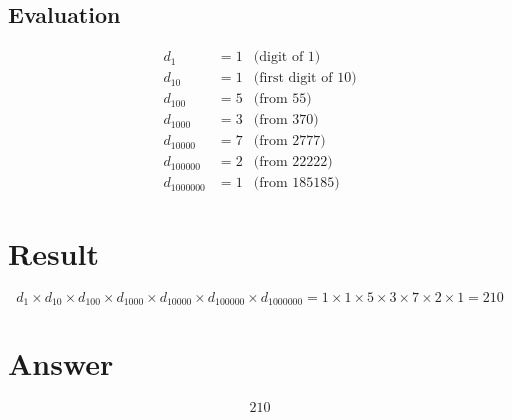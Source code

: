 \documentclass[12pt]{article}
\begin{document}
\subsection{Evaluation}
\begin{align*}
    d_1 &= 1 & \text{(digit of 1)} \\
    d_{10} &= 1 & \text{(first digit of 10)} \\
    d_{100} &= 5 & \text{(from 55)} \\
    d_{1000} &= 3 & \text{(from 370)} \\
    d_{10000} &= 7 & \text{(from 2777)} \\
    d_{100000} &= 2 & \text{(from 22222)} \\
    d_{1000000} &= 1 & \text{(from 185185)}
\end{align*}

\section{Result}
\[
    d_1 \times d_{10} \times d_{100} \times d_{1000} \times d_{10000} \times d_{100000} \times d_{1000000}
    = 1 \times 1 \times 5 \times 3 \times 7 \times 2 \times 1
    = \boxed{210}
\]

\section{Answer}

\[
\boxed{210}
\]
\end{document}
